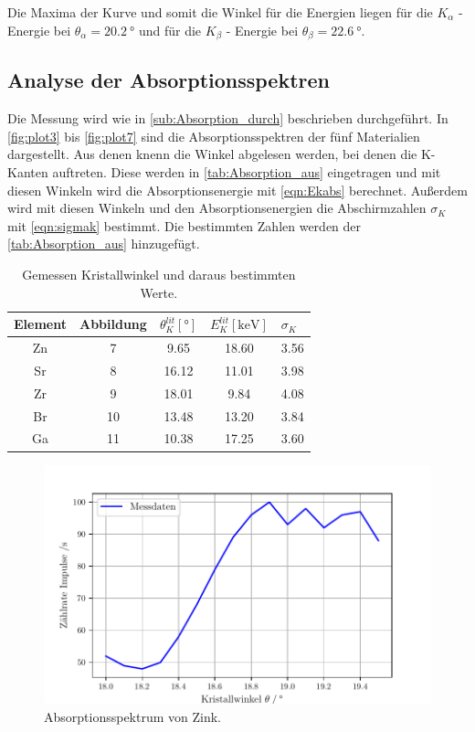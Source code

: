 Die Maxima der Kurve und somit die Winkel für die Energien liegen für die 
$K_\alpha$ -Energie  bei $\theta_\alpha=\qty{20.2}{\degree}$ und für die $K_\beta$ - Energie
bei $\theta_\beta=\qty{22.6}{\degree}$.




\subsection{Analyse der Absorptionsspektren} %
\label{sub:Absorption_aus}
Die Messung wird wie in \autoref{sub:Absorption_durch} beschrieben durchgeführt.
In \autoref{fig:plot3} bis \ref{fig:plot7} sind die Absorptionsspektren der fünf Materialien dargestellt.
Aus denen knenn die Winkel abgelesen werden, bei denen die K-Kanten auftreten.
Diese werden in \autoref{tab:Absorption_aus} eingetragen und mit diesen Winkeln wird die Absorptionsenergie mit \autoref{eqn:Ekabs} berechnet.
Außerdem wird mit diesen Winkeln und den Absorptionsenergien die Abschirmzahlen $\sigma_K$ mit \autoref{eqn:sigmak} bestimmt.
Die bestimmten Zahlen werden der \autoref{tab:Absorption_aus} hinzugefügt.

\begin{table}[H]
  \centering
  \caption{Gemessen Kristallwinkel und daraus bestimmten Werte.}
  \label{tab:Vorbereitung}
  \begin{tabular}{c S[table-format=2.0] S S[table-format=1.2] }
  \toprule
  {Element} & {Abbildung} & {$\theta_{K}^{lit} [\si{\degree}]$} & {$E_{K}^{lit} [\si{\kilo\electronvolt}]$}& {$\sigma_K$}\\
  \midrule
    Zn & 7 &  9.65 & 18.60 & 3.56 \\
    Sr & 8 & 16.12 & 11.01 & 3.98 \\
    Zr & 9 & 18.01 &  9.84 & 4.08 \\
    Br & 10 & 13.48 & 13.20 & 3.84 \\
    Ga & 11 & 10.38 & 17.25 & 3.60 \\ 
  \bottomrule
  \end{tabular}
\end{table}

\begin{figure}[H]
  \centering
  \includegraphics[width=\textwidth]{build/plot3.pdf}
  \caption{Absorptionsspektrum von Zink.}
  \label{fig:plot3}
\end{figure}

